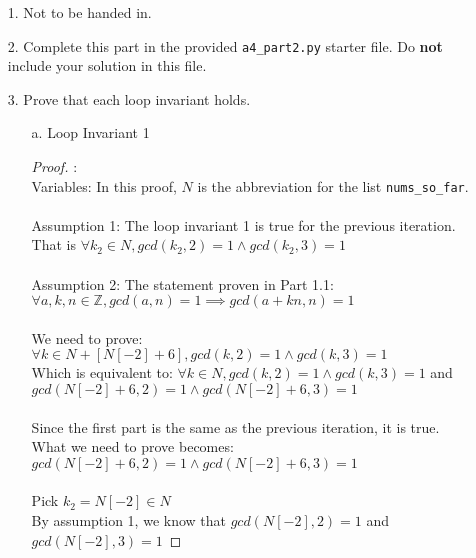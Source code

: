 \documentclass[fontsize=11pt]{article}
\newcommand{\Z}{\mathbb{Z}}
\begin{document}
\begin{enumerate}

\item[1.]
Not to be handed in.

\item[2.]
Complete this part in the provided \texttt{a4\_part2.py} starter file.
Do \textbf{not} include your solution in this file.

\item[3.]
Prove that each loop invariant holds.

\begin{enumerate}
\item[a.] Loop Invariant 1
\begin{proof} : \\
Variables: In this proof, $N$ is the abbreviation for the list \texttt{nums\_so\_far}. \\
\\
Assumption 1: The loop invariant 1 is true for the previous iteration. \\
That is $\forall k_2 \in N, gcd(k_2, 2) = 1 \land gcd(k_2, 3) = 1$ \\
\\
Assumption 2: The statement proven in Part 1.1: \\
$\forall a,k,n \in \Z, gcd(a,n) = 1 \implies gcd(a + kn, n) = 1$ \\
\\
We need to prove: $\forall k \in N + [N[-2] + 6], gcd(k, 2) = 1 \land gcd(k, 3) = 1$ \\
Which is equivalent to: $\forall k \in N, gcd(k, 2) = 1 \land gcd(k, 3) = 1$ and \\ 
$gcd(N[-2] + 6, 2) = 1 \land gcd(N[-2] + 6, 3) = 1$ \\
\\ 
Since the first part is the same as the previous iteration, it is true. \\
What we need to prove becomes: 
$gcd(N[-2] + 6, 2) = 1 \land gcd(N[-2] + 6, 3) = 1$ \\
\\
Pick $k_2 = N[-2] \in N$ \\
By assumption 1, we know that $gcd(N[-2], 2) = 1$ and $gcd(N[-2], 3) = 1$


\end{proof}
\end{enumerate}
\end{enumerate}
\end{document}
